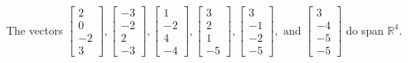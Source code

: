 \begin{exercise}
\begin{exerciseStatement}
  \end{exerciseStatement}
  \begin{exerciseAnswer}
   The vectors \(\left[\begin{array}{r}
2 \\
0 \\
-2 \\
3
\end{array}\right] , \left[\begin{array}{r}
-3 \\
-2 \\
2 \\
-3
\end{array}\right] , \left[\begin{array}{r}
1 \\
-2 \\
4 \\
-4
\end{array}\right] , \left[\begin{array}{r}
3 \\
2 \\
1 \\
-5
\end{array}\right] , \left[\begin{array}{r}
3 \\
-1 \\
-2 \\
-5
\end{array}\right] , \text{ and } \left[\begin{array}{r}
3 \\
-4 \\
-5 \\
-5
\end{array}\right]\) 
  	 do  
	span \(\mathbb{R}^4\).
  


  \end{exerciseAnswer}
\end{exercise}